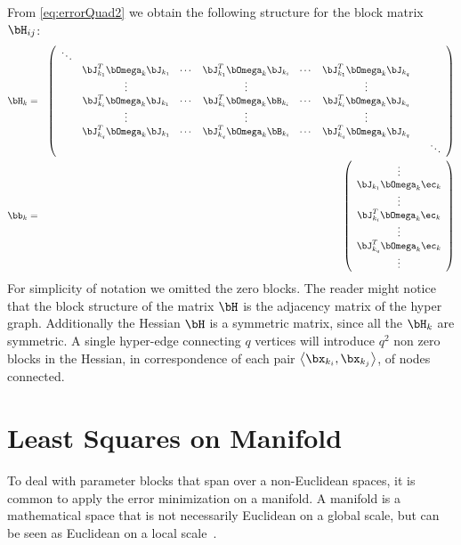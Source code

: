 \documentclass[a4paper]{article}
\begin{document}
From \eqref{eq:errorQuad2} we obtain the following structure for the block matrix $\bH_{ij}$:
\begin{eqnarray}
\bH_{k}&=&\left(
\begin{array}{cccccccc}
\ddots & & & & & & &\\
& \bJ_{k_1}^T \bOmega_{k} \bJ_{k_1} & \cdots & \bJ_{k_1}^T \bOmega_{k} \bJ_{k_i} & \cdots & \bJ_{k_1}^T \bOmega_{k} \bJ_{k_q} &\\
& \vdots & & \vdots & & \vdots & \\
& \bJ_{k_i}^T \bOmega_{k} \bJ_{k_1} & \cdots & \bJ_{k_i}^T \bOmega_{k} \bB_{k_i} & \cdots & \bJ_{k_i}^T \bOmega_{k} \bJ_{k_q} & \\
& \vdots & & \vdots & & \vdots & \\
& \bJ_{k_q}^T \bOmega_{k} \bJ_{k_1} & \cdots & \bJ_{k_q}^T \bOmega_{k} \bB_{k_i} & \cdots & \bJ_{k_q}^T \bOmega_{k} \bJ_{k_q} & \\
& &&&&&& \ddots \\
\end{array}
\right) \\
\bb_{k}&=&\left(
\begin{array}{c}
\vdots\\
\bJ_{k_1} \bOmega_{k} \ec_{k}\\
\vdots\\
\bJ_{k_i}^T \bOmega_{k} \ec_{k}\\
\vdots\\
\bJ_{k_q}^T \bOmega_{k} \ec_{k}\\
\vdots\\
\end{array}
\right)
\end{eqnarray}
For simplicity of notation we omitted the zero blocks.  The reader
might notice that the block structure of the matrix $\bH$ is the
adjacency matrix of the hyper graph.  Additionally the Hessian $\bH$
is a symmetric matrix, since all the $\bH_k$ are symmetric. A single
hyper-edge connecting $q$ vertices will introduce $q^2$ non zero
blocks in the Hessian, in correspondence of each pair $\left<
\bx_{k_i}, \bx_{k_j} \right>$, of nodes connected.


\section{Least Squares on Manifold}
\label{sec:manifold}

To deal with parameter blocks that span over a non-Euclidean spaces,
it is common to apply the error minimization on a manifold.  A
manifold is a mathematical space that is not necessarily Euclidean on
a global scale, but can be seen as Euclidean on a local
scale~\cite{Lee2003SmoothManifolds}.
\end{document}
